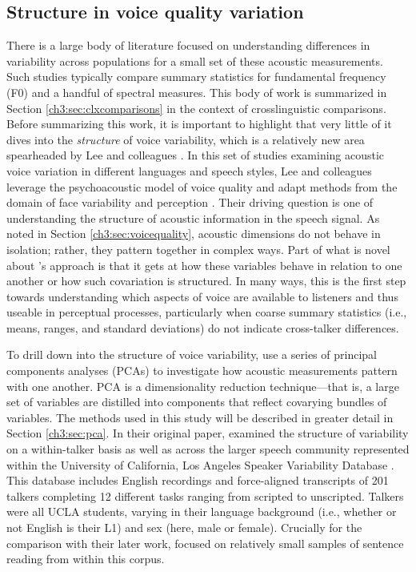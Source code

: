 \subsection{Structure in voice quality variation}

There is a large body of literature focused on understanding differences in variability across populations for a small set of these acoustic measurements. Such studies typically compare summary statistics for fundamental frequency (F0) and a handful of spectral measures. This body of work is summarized in Section \ref{ch3:sec:clxcomparisons} in the context of crosslinguistic comparisons. Before summarizing this work, it is important to highlight that very little of it dives into the \textit{structure} of voice variability, which is a relatively new area spearheaded by Lee and colleagues \citep{lee_2019_acoustic, lee_2019_spontaneous, lee_2020_language}. In this set of studies examining acoustic voice variation in different languages and speech styles, Lee and colleagues leverage the psychoacoustic model of voice quality \citep{kreiman_2014_theory} and adapt methods from the domain of face variability and perception \citep{burton_2016_faces}. Their driving question is one of understanding the structure of acoustic information in the speech signal. As noted in Section \ref{ch3:sec:voicequality}, acoustic dimensions do not behave in isolation; rather, they pattern together in complex ways. Part of what is novel about \citeauthor{lee_2019_acoustic}'s approach is that it gets at how these variables behave in relation to one another or how such covariation is structured. In many ways, this is the first step towards understanding which aspects of voice are available to listeners and thus useable in perceptual processes, particularly when coarse summary statistics (i.e., means, ranges, and standard deviations) do not indicate cross-talker differences. 

To drill down into the structure of voice variability, \citet{lee_2019_acoustic} use a series of principal components analyses (PCAs) to investigate how acoustic measurements pattern with one another. PCA is a dimensionality reduction technique---that is, a large set of variables are distilled into components that reflect covarying bundles of variables. The methods used in this study will be described in greater detail in Section \ref{ch3:sec:pca}. In their original paper, \citet{lee_2019_acoustic} examined the structure of variability on a within-talker basis as well as across the larger speech community represented within the University of California, Los Angeles Speaker Variability Database \citep{keating_2019_database}. This database includes English recordings and force-aligned transcripts of 201 talkers completing 12 different tasks ranging from scripted to unscripted. Talkers were all UCLA students, varying in their language background (i.e., whether or not English is their L1) and sex (here, male or female). Crucially for the comparison with their later work, \citet{lee_2019_acoustic} focused on relatively small samples of sentence reading from within this corpus. 

